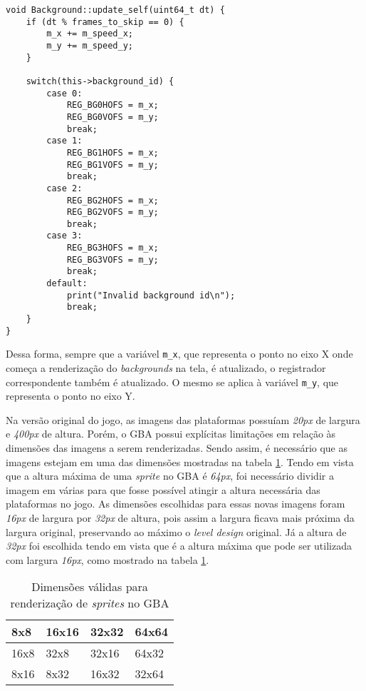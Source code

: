 \begin{lstlisting}[caption={Método responsável por atualizar os índices de renderização do \textit{background}},label={lst:update_bg}]
void Background::update_self(uint64_t dt) {
    if (dt % frames_to_skip == 0) {
        m_x += m_speed_x;
        m_y += m_speed_y;
    }   

    switch(this->background_id) {
        case 0:
            REG_BG0HOFS = m_x;
            REG_BG0VOFS = m_y;
            break;
        case 1:
            REG_BG1HOFS = m_x;
            REG_BG1VOFS = m_y;
            break;
        case 2:
            REG_BG2HOFS = m_x;
            REG_BG2VOFS = m_y;
            break;
        case 3:
            REG_BG3HOFS = m_x;
            REG_BG3VOFS = m_y;
            break;
        default:
            print("Invalid background id\n");
            break;
    }   
}
\end{lstlisting}

Dessa forma, sempre que a variável \texttt{m\_x}, que representa o ponto no eixo X onde começa a renderização do \textit{backgrounds} na tela, é atualizado, o registrador correspondente também é atualizado. O mesmo se aplica à variável \texttt{m\_y}, que representa o ponto no eixo Y.
 
Na versão original do jogo, as imagens das plataformas possuíam \textit{20px} de largura e \textit {400px} de altura. Porém, o GBA possui explícitas limitações em relação às dimensões das imagens a serem renderizadas. Sendo assim, é necessário que as imagens estejam em uma das dimensões mostradas na tabela \ref{table:sprite-sizes}. Tendo em vista que a altura máxima de uma \textit{sprite} no GBA é \textit{64px}, foi necessário dividir a imagem em várias para que fosse possível atingir a altura necessária das plataformas no jogo. As dimensões escolhidas para essas novas imagens foram \textit{16px} de largura por \textit{32px} de altura, pois assim a largura ficava mais próxima da largura original, preservando ao máximo o \textit{level design} original. Já a altura de \textit{32px} foi escolhida tendo em vista que é a altura máxima que pode ser utilizada com largura \textit{16px}, como mostrado na tabela \ref{table:sprite-sizes}.

\begin{table}[htb]
\center
\begin{tabular}{|l|l|l|l|}
\hline
8x8  & 16x16 & 32x32 & 64x64 \\ \hline
16x8 & 32x8  & 32x16 & 64x32 \\ \hline
8x16 & 8x32  & 16x32 & 32x64 \\ \hline
\end{tabular}
\caption{Dimensões válidas para renderização de \textit{sprites} no GBA}
\label{table:sprite-sizes}
\end{table}

